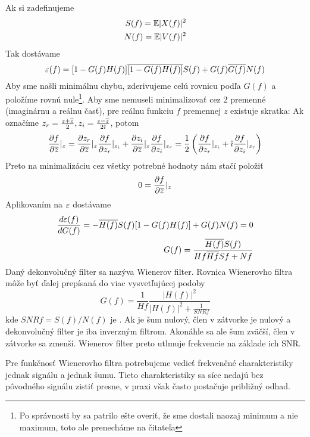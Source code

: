 Ak si zadefinujeme
\begin{eqnarray}
 S(f) = {\mathbb{E}}| X(f)|^2 \\
 N(f) = {\mathbb{E}}| V(f)|^2
\end{eqnarray}
Tak dostávame
\begin{equation}
\varepsilon(f) = [1-G(f)H(f)]\overline{[1-G(f)H(f)]} S(f)
   + G(f) \overline{G(f)} N(f)
\end{equation}
Aby sme našli minimálnu chybu, zderivujeme celú rovnicu podľa $G(f)$ a
položíme rovnú nule\footnote{Po správnosti by sa patrilo ešte overiť,
že sme dostali naozaj minimum a nie maximum, toto ale prenecháme na
čitateľa}. Aby sme nemuseli minimalizovať cez 2 premenné (imaginárnu a
reálnu časť), pre reálnu funkciu $f$ premennej $z$ existuje skratka:
Ak označíme $z_r = \frac{z + \overline{z}}{2}, z_i =
\frac{z-\overline{z}}{2 \hat{\imath}}$, potom
\begin{equation}
\frac{\partial f}{\partial \overline{z}}|_z = 
  \frac{\partial z_r}{\partial \overline{z}}|_z \frac{\partial f}{\partial z_r}|_{z_i} +
    \frac{\partial z_i}{\partial \overline{z}}|_z \frac{\partial f}{\partial z_i}|_{z_r} =
 \frac{1}{2} \left(
    \frac{\partial f}{\partial z_r}|_{z_i} + \hat{\imath} \frac{\partial f}{\partial z_i}|_{z_r}
    \right)
\end{equation}
Preto na minimalizáciu cez všetky potrebné hodnoty nám stačí položiť
\begin{equation}
 0 = \frac{\partial f}{\partial \overline{z}}|_z
\end{equation}
Aplikovaním na $\varepsilon$ dostávame
\begin{eqnarray}
\frac{d \varepsilon(f)}{d G(f)} = -\overline{H(f)} S(f)[1 - G(f) H(f)]  + G(f) N(f) =
0 \\
G(f) = \frac{\overline{H(f)} S(f)}{H{f}\overline{H{f}} S{f} + N{f}}
\end{eqnarray}
Daný dekonvolučný filter sa nazýva Wienerov filter.
Rovnica Wienerovho filtra môže byť ďalej prepísaná do viac vysvetľujúcej podoby
\begin{equation}
G(f) = \frac{1}{H{f}} 
   \frac{|H(f)|^2}{|H(f)|^2 + \frac{1}{SNR{f}}}
\end{equation}
kde $SNR{f} = S(f)/N(f)$ je . Ak je šum
nulový, člen v zátvorke je nulový a dekonvolučný filter je iba
inverzným filtrom. Akonáhle sa ale šum zväčší, člen v zátvorke sa
zmenší. Wienerov filter preto utlmuje frekvencie na základe ich SNR.

Pre funkčnosť Wienerovho filtra potrebujeme vedieť frekvenčné
charakteristiky jednak signálu a jednak šumu. Tieto charakteristiky sa
síce nedajú bez pôvodného signálu zistiť presne, v praxi však často
postačuje približný odhad.

